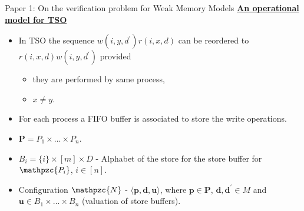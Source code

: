\documentclass[9pt]{beamer}
\begin{document}
\begin{frame}{Paper 1: On the verification problem for Weak Memory Models}
\underline{\textbf{An operational model for TSO}}
\begin{itemize}
\item In TSO the sequence $w(i, y, d^{\prime})r(i,x,d)$ can be reordered to $r(i,x,d)w(i, y, d^{\prime})$
		  provided
			\begin{itemize}
			\item they are performed by same process,
			\item $x \neq y$.
			\end{itemize}
\item For each process a FIFO buffer is associated to store the write operations.
\pause
\item $\mathbf{P} = P_1 \times...\times P_n$.
\item $B_i = \{i\} \times [m] \times D$ - Alphabet of the store for the store buffer for $\mathpzc{P_i}$, $i \in [n]$.
\pause
\item Configuration $\mathpzc{N}$ - $\langle \mathbf{p}, \mathbf{d}, \mathbf{u} \rangle$, where $\mathbf{p} \in \mathbf{P}$,
	    $\mathbf{d}, \mathbf{d^{\prime}} \in M$ and $\mathbf{u} \in B_1 \times...\times B_n$ (valuation of 
			store buffers).
\end{itemize}
\end{frame}
\end{document}
